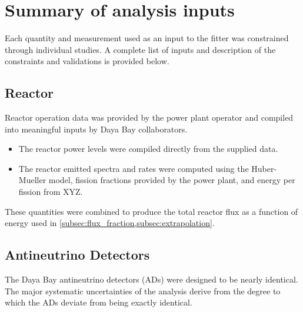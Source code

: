 \chapter{Summary of analysis inputs}
\label{ap:inputs_summary}

Each quantity and measurement used as an input to the fitter
was constrained through individual studies.
A complete list of inputs and description of the constraints and validations
is provided below.

\section{Reactor}
\label{sec:summary_reactor}

Reactor operation data was provided by the power plant operator
and compiled into meaningful inputs by Daya Bay collaborators.
\begin{itemize}
    \item The reactor power levels were compiled directly from
        the supplied data.
    \item The reactor \nuebar{} emitted spectra and rates
        were computed using the Huber-Mueller model,
        fission fractions provided by the power plant,
        and energy per fission from XYZ.
\end{itemize}
These quantities were combined to produce the total reactor flux
as a function of energy used in \cref{subsec:flux_fraction,subsec:extrapolation}.

\section{Antineutrino Detectors}
\label{sec:summary_ads}

The Daya Bay antineutrino detectors (ADs) were designed to be
nearly identical.
The major systematic uncertainties of the analysis derive from
the degree to which the ADs deviate from being exactly identical.

